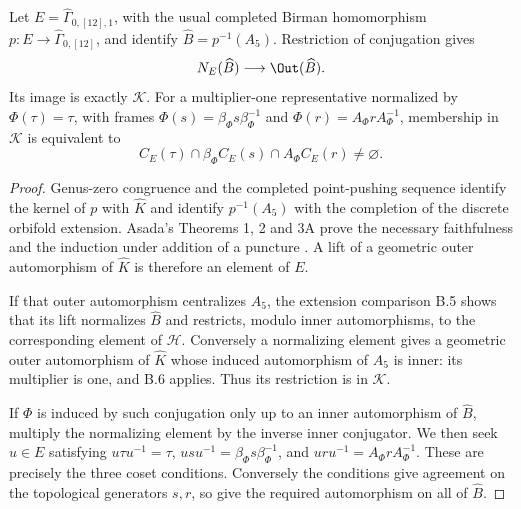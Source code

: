Let \(E=\widehat\Gamma_{0,[12],1}\), with the usual completed
Birman homomorphism \(p:E\to\widehat\Gamma_{0,[12]}\), and identify
\(\widehat B=p^{-1}(A_5)\). Restriction of conjugation gives
\[
 N_E(\widehat B)\longrightarrow\Out(\widehat B).
\]
Its image is exactly \(\mathcal K\). For a multiplier-one
representative normalized by \(\Phi(\tau)=\tau\), with frames
\(\Phi(s)=\beta_\Phi s\beta_\Phi^{-1}\) and
\(\Phi(r)=A_\Phi r A_\Phi^{-1}\), membership in \(\mathcal K\)
is equivalent to
\[
 C_E(\tau)\cap\beta_\Phi C_E(s)\cap A_\Phi C_E(r)\ne\varnothing.
\]
\begin{proof}
Genus-zero congruence and the completed point-pushing sequence identify
the kernel of \(p\) with \(\widehat K\) and identify
\(p^{-1}(A_5)\) with the completion of the discrete orbifold
extension. Asada's Theorems 1, 2 and 3A prove the necessary
faithfulness and the induction under addition of a puncture
\citep{Asada2001}. A lift of a geometric outer automorphism of
\(\widehat K\) is therefore an element of \(E\).

If that outer automorphism centralizes \(A_5\), the extension
comparison B.5 shows that its lift normalizes \(\widehat B\)
and restricts, modulo inner automorphisms, to the corresponding
element of \(\mathcal H\). Conversely a normalizing element gives
a geometric outer automorphism of \(\widehat K\) whose induced
automorphism of \(A_5\) is inner: its multiplier is one, and B.6
applies. Thus its restriction is in \(\mathcal K\).

If \(\Phi\) is induced by such conjugation only up to an inner
automorphism of \(\widehat B\), multiply the normalizing element
by the inverse inner conjugator. We then seek \(u\in E\) satisfying
\(u\tau u^{-1}=\tau\),
\(usu^{-1}=\beta_\Phi s\beta_\Phi^{-1}\), and
\(uru^{-1}=A_\Phi r A_\Phi^{-1}\).
These are precisely the three coset conditions. Conversely the
conditions give agreement on the topological generators \(s,r\),
so give the required automorphism on all of \(\widehat B\).
\end{proof}

